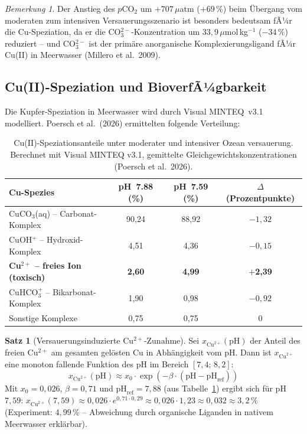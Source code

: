 ﻿\documentclass[12pt,a4paper]{article}
\theoremstyle{definition}
\newtheorem{satz}{Satz}
\theoremstyle{remark}
\newtheorem{bemerkung}{Bemerkung}[section]
\begin{document}
\begin{bemerkung}
Der Anstieg des $p$CO$_2$ um $+707\,\mu$atm ($+69\,\%$) beim \"Ubergang vom
moderaten zum intensiven Versauerungsszenario ist besonders bedeutsam fÃ¼r die
Cu-Speziation, da er die CO$_3^{2-}$-Konzentration um $33{,}9\,\mu$mol\,kg$^{-1}$
($-34\,\%$) reduziert -- und CO$_3^{2-}$ ist der prim\"are anorganische
Komplexierungsligand fÃ¼r Cu(II) in Meerwasser (Millero et al.\ 2009).
\end{bemerkung}

\subsection{Cu(II)-Speziation und BioverfÃ¼gbarkeit}
\label{subsec:cu_speziation}

Die Kupfer-Speziation in Meerwasser wird durch Visual MINTEQ~v3.1 modelliert.
Poersch et al.\ (2026) ermittelten folgende Verteilung:

\begin{table}[H]
  \centering
  \caption{Cu(II)-Speziationsanteile unter moderater und intensiver Ozean\-
           versauerung. Berechnet mit Visual MINTEQ v3.1, gemittelte
           Gleichgewichtskonzentrationen (Poersch et al.\ 2026).}
  \label{tab:cu_speziation}
  \begin{tabular}{lccc}
    \toprule
    Cu-Spezies & pH~7.88 (\%) & pH~7.59 (\%) & $\Delta$ (Prozentpunkte) \\
    \midrule
    CuCO$_3$(aq) -- Carbonat-Komplex     & 90{,}24 & 88{,}92 & $-1{,}32$ \\
    CuOH$^+$ -- Hydroxid-Komplex         & 4{,}51  & 4{,}36  & $-0{,}15$ \\
    \textbf{Cu$^{2+}$ -- freies Ion (toxisch)} & \textbf{2{,}60}  & \textbf{4{,}99}  & \textbf{$+$2{,}39} \\
    CuHCO$_3^+$ -- Bikarbonat-Komplex    & 1{,}90  & 0{,}98  & $-0{,}92$ \\
    Sonstige Komplexe                     & 0{,}75  & 0{,}75  & $0$ \\
    \bottomrule
  \end{tabular}
\end{table}

\begin{satz}[Versauerungsinduzierte Cu$^{2+}$-Zunahme]
\label{satz:cu_increase}
Sei $x_{\text{Cu}^{2+}}(\text{pH})$ der Anteil des freien Cu$^{2+}$ am
gesamten gel\"osten Cu in Abh\"angigkeit vom pH. Dann ist
$x_{\text{Cu}^{2+}}$ eine monoton fallende Funktion des pH im Bereich
$[7{,}4;\, 8{,}2]$:
\begin{equation}
  x_{\text{Cu}^{2+}}(\text{pH}) \approx
  x_0 \cdot \exp\left(-\beta \cdot (\text{pH} - \text{pH}_{\text{ref}})\right)
  \label{eq:cu_speciation_model}
\end{equation}
Mit $x_0 = 0{,}026$, $\beta = 0{,}71$ und $\text{pH}_{\text{ref}} = 7{,}88$
(aus Tabelle~\ref{tab:cu_speziation}) ergibt sich f\"ur pH~$7{,}59$:
$x_{\text{Cu}^{2+}}(7{,}59) \approx 0{,}026 \cdot e^{0{,}71 \cdot 0{,}29}
\approx 0{,}026 \cdot 1{,}23 \approx 0{,}032 \approx 3{,}2\,\%$
(Experiment: $4{,}99\,\%$ -- Abweichung durch organische Liganden in nativem
Meerwasser erkl\"arbar).
\end{satz}
\end{document}
